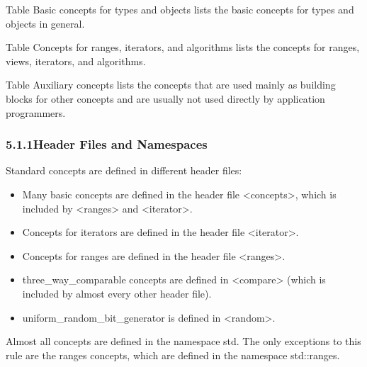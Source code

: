 
Table Basic concepts for types and objects lists the basic concepts for types and objects in general.

Table Concepts for ranges, iterators, and algorithms lists the concepts for ranges, views, iterators, and algorithms.

Table Auxiliary concepts lists the concepts that are used mainly as building blocks for other concepts and are usually not used directly by application programmers.

\subsubsection*{ 5.1.1\hspace{0.2cm}Header Files and Namespaces}

Standard concepts are defined in different header files:

\begin{itemize}
\item
Many basic concepts are defined in the header file <concepts>, which is included by <ranges> and <iterator>.

\item
Concepts for iterators are defined in the header file <iterator>.

\item
Concepts for ranges are defined in the header file <ranges>.

\item
three\_way\_comparable concepts are defined in <compare> (which is included by almost every other header file).

\item
uniform\_random\_bit\_generator is defined in <random>.
\end{itemize}

Almost all concepts are defined in the namespace std. The only exceptions to this rule are the ranges concepts, which are defined in the namespace std::ranges.

